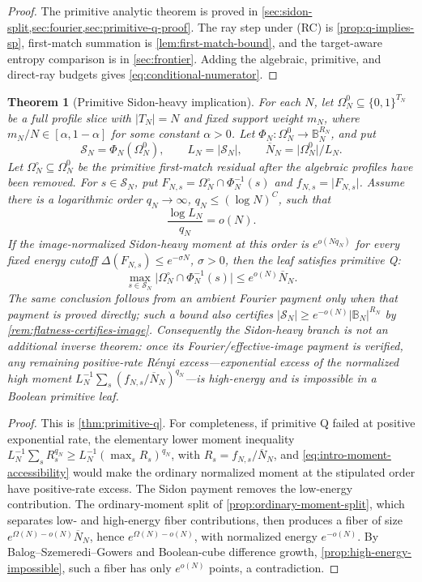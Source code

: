 \documentclass[12pt,a4paper]{amsart}
\numberwithin{equation}{section}
\newtheorem{theorem}{Theorem}[section]
\theoremstyle{remark}
\newcommand{\B}{\mathbb B}
\newcommand{\Omc}{\Omega^{\circ}}
\newcommand{\Scal}{\mathcal S}
\newcommand{\barN}{\overline N}
\newcommand{\Renyi}{R\'enyi}
\newcommand{\abs}[1]{\lvert #1\rvert}
\begin{document}
\begin{proof}
The primitive analytic theorem is proved in
\cref{sec:sidon-split,sec:fourier,sec:primitive-q-proof}.  The ray step under
\textup{(RC)} is \cref{prop:q-implies-sp}, first-match summation is
\cref{lem:first-match-bound}, and the target-aware entropy comparison is in
\cref{sec:frontier}.  Adding the algebraic, primitive, and direct-ray
budgets gives \eqref{eq:conditional-numerator}.
\end{proof}

\begin{theorem}[Primitive Sidon-heavy implication]
\label{thm:intro-sidon-heavy-repair}
For each \(N\), let \(\Omega_N^0\subseteq\{0,1\}^{T_N}\) be a
full profile slice with \(\abs{T_N}=N\) and fixed support weight \(m_N\),
where \(m_N/N\in[\alpha,1-\alpha]\) for some constant \(\alpha>0\).  Let
\(\Phi_N:\Omega_N^0\to\B_N^{R_N}\), and put
\[
 \Scal_N=\Phi_N(\Omega_N^0),\qquad L_N=\abs{\Scal_N},
 \qquad \barN_N=\abs{\Omega_N^0}/L_N.
\]
Let \(\Omc_N\subseteq\Omega_N^0\) be the primitive first-match residual
after the algebraic profiles have been removed.  For \(s\in\Scal_N\), put
\(F_{N,s}=\Omc_N\cap\Phi_N^{-1}(s)\) and
\(f_{N,s}=\abs{F_{N,s}}\).  Assume there is
a logarithmic order \(q_N\to\infty\), \(q_N\le(\log N)^C\), such that
\[
             \frac{\log L_N}{q_N}=o(N).
 \tag{1.11}\label{eq:intro-moment-accessibility}
\]
If the image-normalized Sidon-heavy moment at this order is
\(e^{o(Nq_N)}\) for every fixed energy cutoff
\(\Delta(F_{N,s})\le e^{-\sigma N}\), \(\sigma>0\), then the leaf satisfies
primitive Q:
\[
        \max_{s\in\Scal_N}\abs{\Omc_N\cap\Phi_N^{-1}(s)}
        \le e^{o(N)}\barN_N .
\]
The same conclusion follows from an ambient Fourier payment only when that
payment is proved directly; such a bound also certifies
\(\abs{\Scal_N}\ge e^{-o(N)}\abs{\B_N}^{R_N}\) by
\cref{rem:flatness-certifies-image}.
Consequently the Sidon-heavy branch is not an additional inverse theorem: once
its Fourier/effective-image payment is verified, any remaining positive-rate
\Renyi{} excess---exponential excess of the normalized high moment
\(L_N^{-1}\sum_s(f_{N,s}/\barN_N)^{q_N}\)---is high-energy and is impossible
in a Boolean primitive leaf.
\end{theorem}

\begin{proof}
This is \cref{thm:primitive-q}.  For completeness, if primitive Q failed
at positive exponential rate, the elementary lower moment inequality
\(L_N^{-1}\sum_sR_s^{q_N}\ge L_N^{-1}(\max_sR_s)^{q_N}\), with
\(R_s=f_{N,s}/\barN_N\), and
\eqref{eq:intro-moment-accessibility} would make the ordinary normalized
moment at the stipulated order have positive-rate excess.
The Sidon payment removes the low-energy contribution.  The
ordinary-moment split of \cref{prop:ordinary-moment-split}, which
separates low- and high-energy fiber contributions, then produces a fiber
of size \(e^{\Omega(N)-o(N)}\barN_N\), hence
\(e^{\Omega(N)-o(N)}\), with normalized energy \(e^{-o(N)}\).  By
Balog--Szemeredi--Gowers and Boolean-cube difference growth,
\cref{prop:high-energy-impossible}, such a fiber has only
\(e^{o(N)}\) points, a contradiction.
\end{proof}
\end{document}
